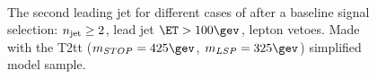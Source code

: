 \begin{figure}[h!]
  \centering
  ~~
  \\
  \caption{\label{fig:asymMotivation} The second leading jet \PT for different
  cases of \HT after a baseline signal selection: $n_{\text{jet}}\geq2$, lead jet
  $\ET>100\gev$, lepton vetoes. Made with the T2tt ($m_{STOP}=425\gev$, $m_{LSP}=325\gev$) simplified model sample.}
\end{figure}

